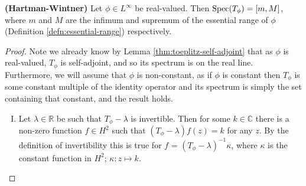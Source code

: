 \documentclass[../main.tex]{subfiles}
\begin{document}
\begin{theorem}{\textbf{(Hartman-Wintner)}}\label{thm:hartman-wintner}
Let $\phi \in L^\infty$ be real-valued. Then $\mathrm{Spec}(T_\phi) = [m, M]$, where $m$
and $M$ are the infimum and supremum of the essential range of $\phi$
(Definition \ref{defn:essential-range}) respectively. \end{theorem}
\begin{proof}
Note we already know by Lemma \ref{thm:toeplitz-self-adjoint} that as $\phi$ is
real-valued, $T_\phi$ is self-adjoint, and so its spectrum is on the
real line. Furthermore, we will assume that $\phi$ is non-constant, as
if $\phi$ is constant then $T_\phi$ is some constant multiple of the
identity operator and its spectrum is simply the set containing that constant,
and the result holds. 
\begin{enumerate}[I.]
\item Let $\lambda \in \mathbb{R}$ be such that $T_\phi - \lambda$ is
invertible. Then for some $k \in \mathbb{C}$ there is a non-zero
function $f \in H^2$ such that $(T_\phi - \lambda)f(z) = k$ for
any $z$. By the definition of invertibility this is true for $f$
= $(T_\phi - \lambda)^{-1}\kappa$, where $\kappa$ is the
constant function in $H^2$; $\kappa : z \mapsto k$.


\end{enumerate}
\end{proof}
\end{document}
